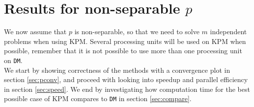 \chapter{Results for non-separable $p$} \label{sec:para}%

We now assume that $p$ is non-separable, so that we need to solve $m$ independent problems when using KPM. Several processing units will be used on KPM when possible, remember that it is not possible to use more than one processing unit on \texttt{DM}. \\%

We start by showing correctness of the methods with a convergence plot in section \ref{sec:pconv}, and proceed with looking into speedup and parallel efficiency in section \ref{sec:speed}. We end by investigating how computation time for the best possible case of KPM compares to \texttt{DM} in section \ref{sec:compare}. 

